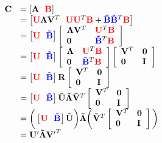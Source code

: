 \begin{equation}
\begin{array}{llll}
\mathbf{C} &= \left[{\mathbf{A}} \ \ {\color{red}\mathbf{B}}\right]\\
&= \left[{\color{red}\mathbf{U}}\mathbf{\Lambda}\mathbf{V}^T \ \ {\color{red}\mathbf{U}}{\color{red}\mathbf{U}}^T{\color{red}\mathbf{B}} + {\color{blue}\mathbf{\tilde{B}}} {\color{blue}\mathbf{\tilde{B}}^T}{{\color{red}\mathbf{B}}}\right]\\
&= \left[{\color{red}\mathbf{U}} \ \ {\color{blue}\mathbf{\tilde{B}}}\right]\left[\begin{array}{llll}\mathbf{\Lambda}\mathbf{V}^T &{\color{red}\mathbf{U}}^T{\color{red}{\color{red}\mathbf{B}}}\\ \mathbf{0} & {\color{blue}\mathbf{\tilde{B}}}^T{\color{red}{\color{red}\mathbf{B}}}\end{array}\right]\\
&= \left[{\color{red}\mathbf{U}} \ \ {\color{blue}\mathbf{\tilde{B}}}\right]\left[\begin{array}{llll}\mathbf{\Lambda} & {\color{red}\mathbf{U}}^T{\color{red}{\color{red}\mathbf{B}}}\\ \mathbf{0} & {\color{blue}\mathbf{\tilde{B}}}^T{\color{red}{\color{red}\mathbf{B}}}\end{array}\right] \left[\begin{array}{llll}\mathbf{V}^T & \mathbf{0}\\ \mathbf{0} & \mathbf{I}\end{array}\right]\\
&= \left[{\color{red}\mathbf{U}} \ \ {\color{blue}\mathbf{\tilde{B}}}\right]\mathbf{R} \left[\begin{array}{llll}\mathbf{V}^T & \mathbf{0}\\ \mathbf{0} & \mathbf{I}\end{array}\right]\\
 &= \left[{\color{red}\mathbf{U}} \ \ {\color{blue}\mathbf{\tilde{B}}}\right]\mathbf{\tilde{U}}\mathbf{\tilde{\Lambda}}\mathbf{\tilde{V}}^T \left[\begin{array}{llll}\mathbf{V}^T & \mathbf{0}\\ \mathbf{0} & \mathbf{I}\end{array}\right]\\
&= \bigg(\left[{\color{red}\mathbf{U}} \ \ {\color{blue}\mathbf{\tilde{B}}}\right]\mathbf{\tilde{U}}\bigg) \mathbf{\tilde{\Lambda}} \bigg(\mathbf{\tilde{V}}^T \left[\begin{array}{llll}\mathbf{V}^T & \mathbf{0}\\ \mathbf{0} & \mathbf{I}\end{array}\right]\bigg)\\
&=\mathbf{U'}\mathbf{\tilde{\Lambda}}\mathbf{V'}^T
\end{array}
\label{Eqn:short}
\end{equation}

